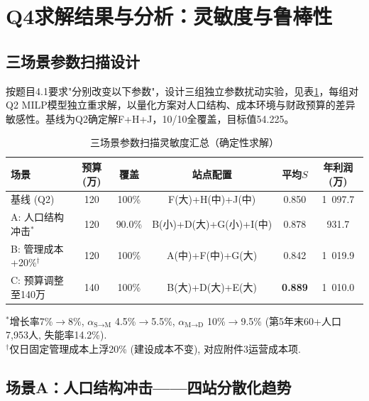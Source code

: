 
\section{Q4求解结果与分析：灵敏度与鲁棒性}

\subsection{三场景参数扫描设计}

按题目4.1要求"分别改变以下参数"，设计三组独立参数扰动实验，见表\ref{tab:q4_sensitivity}，每组对Q2 MILP模型独立重求解，以量化方案对人口结构、成本环境与财政预算的差异敏感性。基线为Q2确定解F+H+J，10/10全覆盖，目标值54.225。

\begin{table}[H]
\centering
\caption{三场景参数扫描灵敏度汇总（确定性求解）}
\label{tab:q4_sensitivity}
\footnotesize
\begin{tabular}{lccccc}
\toprule
\textbf{场景} & \textbf{预算(万)} & \textbf{覆盖} & \textbf{站点配置} & \textbf{平均$S$} & \textbf{年利润(万)} \\
\midrule
基线 (Q2) & 120 & 100\% & F(大)+H(中)+J(中) & 0.850 & 1~097.7 \\
\midrule
A: 人口结构冲击$^*$ & 120 & 90.0\% & B(小)+D(大)+G(小)+I(中) & 0.878 & 931.7 \\
B: 管理成本+20\%$^\dagger$ & 120 & 100\% & A(中)+F(中)+G(大) & 0.842 & 1~019.9 \\
C: 预算调整至140万 & 140 & 100\% & B(大)+D(大)+E(大) & \textbf{0.889} & 1~010.0 \\
\bottomrule
\end{tabular}

\vspace{4pt}
{\footnotesize $^*$增长率7\%$\to$8\%, $\alpha_{\text{S}\to\text{M}}$ 4.5\%$\to$5.5\%, $\alpha_{\text{M}\to\text{D}}$ 10\%$\to$9.5\% (第5年末60+人口7,953人, 失能率14.2\%). \\[2pt]
$^\dagger$仅日固定管理成本上浮20\% (建设成本不变), 对应附件3运营成本项.}
\end{table}

\subsection{场景A：人口结构冲击——四站分散化趋势}

